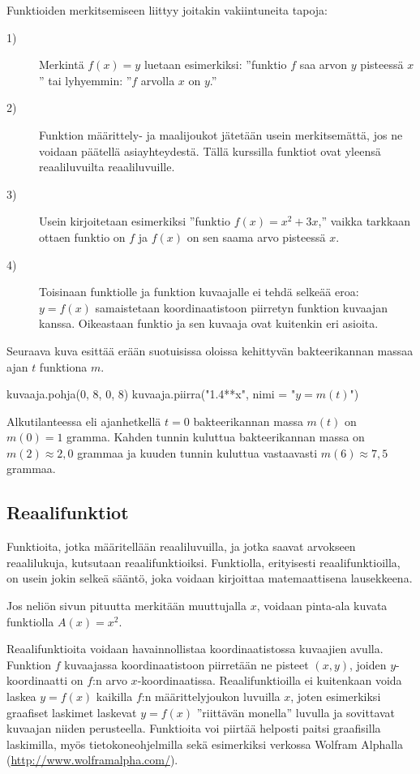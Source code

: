 Funktioiden merkitsemiseen liittyy joitakin vakiintuneita tapoja:
\begin{description}
	\item[1)] Merkintä $f(x) = y$ luetaan esimerkiksi: ''funktio \(f\) saa arvon $y$ pisteessä $x$'' tai lyhyemmin: ''\(f\) arvolla \(x\) on \(y\).''
	\item[2)] Funktion määrittely- ja maalijoukot jätetään usein merkitsemättä, jos ne voidaan päätellä asiayhteydestä.
		Tällä kurssilla funktiot ovat yleensä reaaliluvuilta reaaliluvuille.
	\item[3)] Usein kirjoitetaan esimerkiksi ''funktio $f(x) = x^2+3x$,'' vaikka tarkkaan ottaen funktio on $f$ ja
		$f(x)$ on sen saama arvo pisteessä $x$.
	\item[4)] Toisinaan funktiolle ja funktion kuvaajalle ei tehdä selkeää eroa:
		$y = f(x)$ samaistetaan koordinaatistoon piirretyn funktion kuvaajan kanssa.
		Oikeastaan funktio ja sen kuvaaja ovat kuitenkin eri asioita.
\end{description}
\begin{esimerkki}
Seuraava kuva esittää erään suotuisissa oloissa kehittyvän bakteerikannan massaa ajan \(t\) funktiona $m$.

\begin{kuva}
    kuvaaja.pohja(0, 8, 0, 8)
    kuvaaja.piirra("1.4**x", nimi = "$y=m(t)$")
\end{kuva}

Alkutilanteessa eli ajanhetkellä \(t=0\) bakteerikannan massa \(m(t)\) on \(m(0)=1\) gramma. Kahden tunnin kuluttua bakteerikannan massa on \(m(2)\approx 2,0\) grammaa ja kuuden tunnin kuluttua vastaavasti \(m(6)\approx 7,5\) grammaa. 
\end{esimerkki}

\subsection*{Reaalifunktiot}

Funktioita, jotka määritellään reaaliluvuilla, ja jotka saavat arvokseen reaalilukuja, kutsutaan reaalifunktioiksi.
Funktiolla, erityisesti reaalifunktioilla, on usein jokin selkeä sääntö, joka voidaan kirjoittaa matemaattisena lausekkeena.

\begin{esimerkki}
	Jos neliön sivun pituutta merkitään muuttujalla $x$, voidaan pinta-ala kuvata funktiolla $A(x) = x^2$.
\end{esimerkki} 

Reaalifunktioita voidaan havainnollistaa koordinaatistossa kuvaajien avulla.
Funktion $f$ kuvaajassa koordinaatistoon piirretään ne pisteet $(x, y)$, joiden $y$-koordinaatti on $f$:n arvo $x$-koordinaatissa.
Reaalifunktioilla ei kuitenkaan voida laskea $y = f(x)$ kaikilla $f$:n määrittelyjoukon luvuilla $x$, joten esimerkiksi graafiset laskimet
laskevat $y = f(x)$ ''riittävän monella'' luvulla ja sovittavat kuvaajan niiden perusteella.
Funktioita voi piirtää helposti paitsi graafisilla laskimilla, myös tietokoneohjelmilla sekä esimerkiksi verkossa
Wolfram Alphalla (\url{http://www.wolframalpha.com/}).

